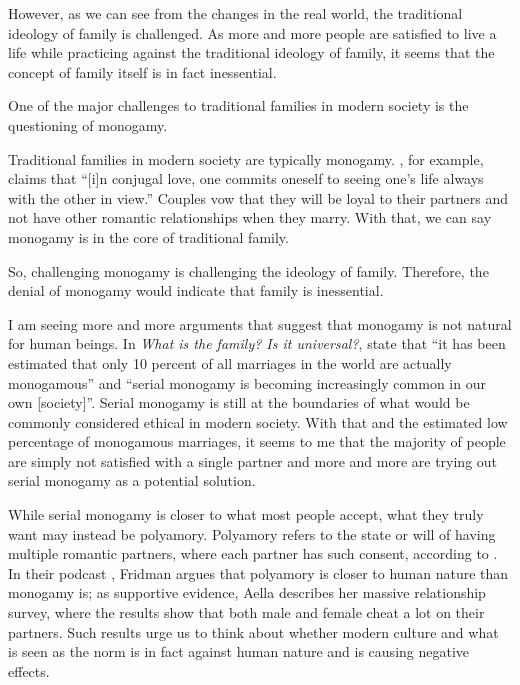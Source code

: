 \documentclass[12pt]{article}
\begin{document}
However, as we can see from the changes in the real world,
the traditional ideology of family is challenged.
As more and more people are satisfied to live a life while
practicing against the traditional ideology of family,
it seems that the concept of family itself is in fact inessential.

One of the major challenges to traditional families
in modern society is the questioning of monogamy.

Traditional families in modern society are typically monogamy.
\citet[pp. 4]{schwitzgebel2008thoughts}, for example, claims that
``[i]n conjugal love,
one commits oneself to seeing one's life always with the other in view.''
Couples vow that they will be loyal to their partners and not have other
romantic relationships when they marry.
With that, we can say monogamy is in the core of traditional family.

So, challenging monogamy is challenging the ideology of family.
Therefore, the denial of monogamy would indicate that family is inessential.

I am seeing more and more arguments that suggest that monogamy is not natural
for human beings.
In \textit{What is the family? Is it universal?},
\citet[p. 63]{gittins1993family} state that
``it has been estimated that only 10 percent of all
marriages in the world are actually monogamous'' and
``serial monogamy is becoming increasingly common in our own [society]''.
Serial monogamy is still at the boundaries of what would be commonly considered
ethical in modern society.
With that and the estimated low percentage of monogamous marriages,
it seems to me that the majority of people are simply not satisfied with a
single partner and
more and more are trying out serial monogamy as a potential solution.

While serial monogamy is closer to what most people accept,
what they truly want may instead be polyamory.
Polyamory refers to the state or will of having multiple romantic partners,
where each partner has such consent, according to \cite{wikipedia2023polyamory}.
In their podcast \citep{fridman2023aella},
Fridman argues that polyamory is closer to human nature than monogamy is;
as supportive evidence, Aella describes her massive relationship survey,
where the results show that both male and female cheat a lot on their partners.
Such results urge us to think about whether modern culture and what is seen as
the norm is in fact against human nature and is causing negative effects.
\end{document}
